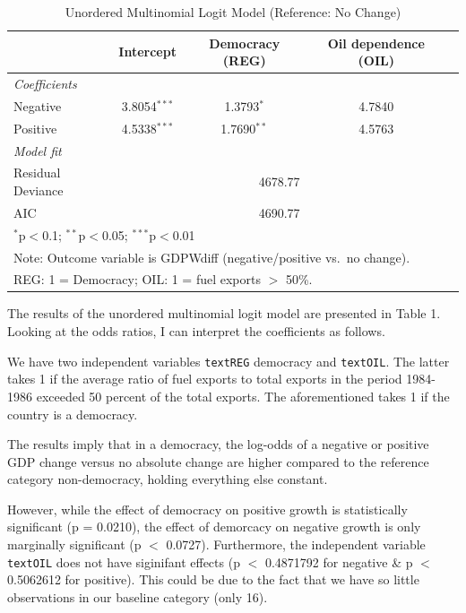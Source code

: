 \documentclass[12pt,letterpaper]{article}
\begin{document}
\begin{enumerate}
	
	\begin{table}[H]
		\centering
		\caption{Unordered Multinomial Logit Model (Reference: No Change)}
		\label{tab:mnl}
		\begin{tabular}{lcccc}
			\hline\hline
			& Intercept       & Democracy (REG)             & Oil dependence (OIL)    \\
			\hline
			\multicolumn{4}{l}{\textit{Coefficients}} \\
			Negative          & 3.8054$^{***}$  & 1.3793$^{*}$    & 4.7840 \\
			Positive          & 4.5338$^{***}$  & 1.7690$^{**}$   & 4.5763 \\
			\hline
			\multicolumn{4}{l}{\textit{Model fit}} \\
			Residual Deviance & \multicolumn{3}{c}{4678.77} \\
			AIC               & \multicolumn{3}{c}{4690.77} \\
			\hline\hline
			\multicolumn{4}{l}{\footnotesize $^{*}$p$<$0.1; $^{**}$p$<$0.05; $^{***}$p$<$0.01} \\
			\multicolumn{4}{l}{\footnotesize Note: Outcome variable is GDPWdiff (negative/positive vs.\ no change).} \\
			\multicolumn{4}{l}{\footnotesize REG: 1 = Democracy; OIL: 1 = fuel exports $>$ 50\%.} \\
		\end{tabular}
	\end{table}
\end{enumerate}

\noindent The results of the unordered multinomial logit model are presented in Table 1. 
Looking at the odds ratios, I can interpret the coefficients as follows.\newline

\noindent We have two independent  variables \texttt{textREG} democracy  and \texttt{textOIL}. The latter takes 1 if the average ratio of fuel exports to total exports in the period 1984-1986 exceeded 50 percent of the total exports. The aforementioned takes 1 if the country is a democracy. \newline

\noindent The results imply that in a democracy, the log-odds of a negative or positive GDP change versus no absolute change are higher compared to the reference category non-democracy, holding everything else constant. \newline


\noindent However, while the effect of democracy on positive growth is statistically significant (p = 0.0210), the effect of demorcacy on negative growth is only marginally significant (p $<$ 0.0727). Furthermore, the independent variable \texttt{textOIL} does not have siginifant effects (p $<$ 0.4871792 for negative \& p $<$  0.5062612 for positive). This could be due to the fact that we have so little observations in our baseline category (only 16).
\end{document}
